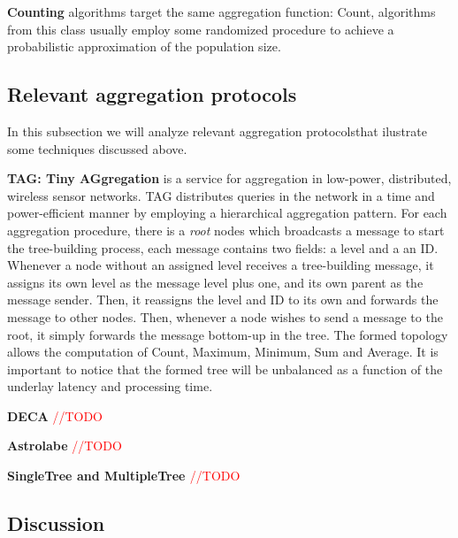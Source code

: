 \textbf{Counting} algorithms target the same aggregation function: Count, algorithms from this class usually employ some randomized procedure to achieve a probabilistic approximation of the population size.

\subsection{Relevant aggregation protocols}

In this subsection we will analyze relevant aggregation protocolsthat ilustrate some techniques discussed above.

\textbf{TAG: Tiny AGgregation}\cite{Madden2002} is a service for aggregation in low-power, distributed, wireless sensor networks. TAG distributes queries in the network in a time and power-efficient manner by employing a hierarchical aggregation pattern. For each aggregation procedure, there is a \textit{root} nodes which broadcasts a message to start the tree-building process, each message contains two fields: a level and a an ID. Whenever a node without an assigned level receives a tree-building message, it assigns its own level as the message level plus one, and its own parent as the message sender. Then, it reassigns the level and ID to its own and forwards the message to other nodes. Then, whenever a node wishes to send a message to the root, it simply forwards the message bottom-up in the tree. The formed topology allows the computation of Count, Maximum, Minimum, Sum and Average. It is important to notice that the formed tree will be unbalanced as a function of the underlay latency and processing time.

\textbf{DECA} \cite{Artigas2006} \textcolor{red}{//TODO}

\textbf{Astrolabe} \cite{Renesse2003} \textcolor{red}{//TODO}

\textbf{SingleTree \cite{} and MultipleTree \cite{}} \textcolor{red}{//TODO}

\subsection{Discussion}